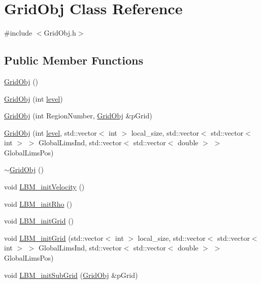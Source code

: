 \hypertarget{class_grid_obj}{}\section{Grid\+Obj Class Reference}
\label{class_grid_obj}


{\ttfamily \#include $<$Grid\+Obj.\+h$>$}

\subsection*{Public Member Functions}
\begin{DoxyCompactItemize}
\item 
\hyperlink{class_grid_obj_acc3416599b59236e87b6b60a07e678af}{Grid\+Obj} ()
\item 
\hyperlink{class_grid_obj_aaadde3417da5f31e1b8b33635487b56e}{Grid\+Obj} (int \hyperlink{class_grid_obj_a7dfedc4442a386ec15c8b03ca899c1a9}{level})
\item 
\hyperlink{class_grid_obj_a40600a8b8a286b8299bca8265b62f51b}{Grid\+Obj} (int Region\+Number, \hyperlink{class_grid_obj}{Grid\+Obj} \&p\+Grid)
\item 
\hyperlink{class_grid_obj_abc1ce149816c2f96870a859ce28c598d}{Grid\+Obj} (int \hyperlink{class_grid_obj_a7dfedc4442a386ec15c8b03ca899c1a9}{level}, std\+::vector$<$ int $>$ local\+\_\+size, std\+::vector$<$ std\+::vector$<$ int $>$ $>$ Global\+Lims\+Ind, std\+::vector$<$ std\+::vector$<$ double $>$ $>$ Global\+Lims\+Pos)
\item 
\hyperlink{class_grid_obj_ace563099d85c330ac48f35b515422522}{$\sim$\+Grid\+Obj} ()
\item 
void \hyperlink{class_grid_obj_aa8041f7344af6cf9732199aa107fdbc6}{L\+B\+M\+\_\+init\+Velocity} ()
\item 
void \hyperlink{class_grid_obj_aac0e8a3fe74c69b3308ef3e19100f95c}{L\+B\+M\+\_\+init\+Rho} ()
\item 
void \hyperlink{class_grid_obj_aeea74cc13001620abec1ba819233f714}{L\+B\+M\+\_\+init\+Grid} ()
\item 
void \hyperlink{class_grid_obj_adfbe5c22b6b6f076615ea7b77c2d7cc4}{L\+B\+M\+\_\+init\+Grid} (std\+::vector$<$ int $>$ local\+\_\+size, std\+::vector$<$ std\+::vector$<$ int $>$ $>$ Global\+Lims\+Ind, std\+::vector$<$ std\+::vector$<$ double $>$ $>$ Global\+Lims\+Pos)
\item 
void \hyperlink{class_grid_obj_a697f4d7fc6c9ed18e609528847b1e175}{L\+B\+M\+\_\+init\+Sub\+Grid} (\hyperlink{class_grid_obj}{Grid\+Obj} \&p\+Grid)

\end{DoxyCompactItemize}

